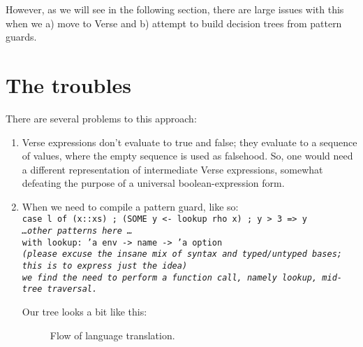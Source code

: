 \documentclass{article}
\begin{document}
    However, as we will see in the following section, there are large issues
    with this when we a) move to Verse and b) attempt to build decision trees
    from pattern guards. 

\section{The troubles}

There are several problems to this approach: 

\begin{enumerate}
    \item Verse expressions don't evaluate to true and false; they evaluate to a
          sequence of values, where the empty sequence \fail \; is used as
          falsehood. So, one would need a different representation of
          intermediate Verse expressions, somewhat defeating the purpose 
          of a universal boolean-expression form. 
    \item When we need to compile a pattern guard, like so: \\
        \tt{case l of (x::xs) ; (SOME y <- lookup rho x) ; y > 3 => y \\
            \it{\dots other patterns here \dots}} \\
        with \tt{lookup: 'a env -> name -> 'a option} \\
        \it{(please excuse the insane mix of syntax and typed/untyped bases; 
        this is to express just the idea)} \\
        we find the need to perform a function call, namely 
        \tt{lookup}, mid-tree traversal. 

        Our tree looks a bit like this: 


\bigskip
\begin{figure}[H]
    \centering
    \caption{Flow of language translation.}
    \label{fig:graph}
\end{figure}
\end{enumerate}
\end{document}
